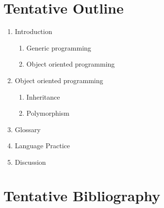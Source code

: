 \section*{Tentative Outline}
\begin{enumerate} [label=\Roman*.]
\item Introduction
\begin{enumerate} [label=\Alph*.]
\item Generic programming
\item Object oriented programming
\end{enumerate}
\item Object oriented programming
\begin{enumerate} [label=\Alph*.]
\item Inheritance
\item Polymorphism
\end{enumerate}
\item Glossary
\item Language Practice
\item Discussion
\end{enumerate}
\section*{Tentative Bibliography}
\nocite{*}
\printbibliography[heading=none]
